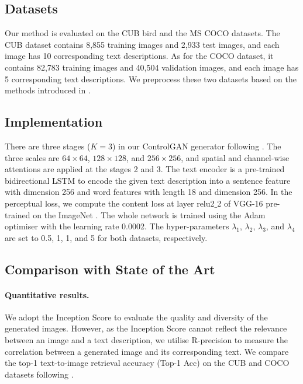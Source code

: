 \documentclass{article}
\begin{document}
\subsection{Datasets}

Our method is evaluated on the CUB bird \citep{wah2011caltech} and the MS COCO \citep{lin2014microsoft} datasets. The CUB dataset contains 8,855 training images and 2,933 test images, and each image has 10 corresponding text descriptions. As for the COCO dataset, it contains 82,783 training images and 40,504 validation images, and each image has 5 corresponding text descriptions. We preprocess these two datasets based on the methods introduced in \cite{zhang2017stackgan}.

\subsection{Implementation}

There are three stages ($K=3$) in our ControlGAN generator following \cite{xu2018attngan}. The three scales are $64 \times 64$, $128 \times 128$, and $256 \times 256$, and spatial and channel-wise attentions {are applied at the stages 2 and 3}. The text encoder is a pre-trained bidirectional LSTM \cite{schuster1997bidirectional} to encode the given text description into a sentence feature with dimension 256 and word features with length 18 and dimension 256. In the perceptual loss, we compute the content loss at layer relu2$\_$2 of VGG-16 \cite{simonyan2014very} pre-trained on the ImageNet \cite{russakovsky2015imagenet}. The whole network is trained using the Adam optimiser \cite{kingma2014adam} with the learning rate 0.0002. The hyper-parameters $\lambda_{1}$, $\lambda_{2}$, $\lambda_{3}$, and $\lambda_{4}$ are set to 0.5, 1, 1, and 5 for both datasets, respectively. 

\subsection{Comparison with State of the Art}

\paragraph{Quantitative results.}
We adopt the Inception Score \cite{salimans2016improved} to evaluate the quality and diversity of the generated images.
However, as the Inception Score cannot reflect the relevance between an image and a text description, we utilise R-precision \cite{xu2018attngan} to measure the correlation between a generated image and its corresponding text.
 We compare the top-1 text-to-image retrieval accuracy (Top-1 Acc) on the CUB and COCO datasets following \cite{nam2018text}.
\end{document}
